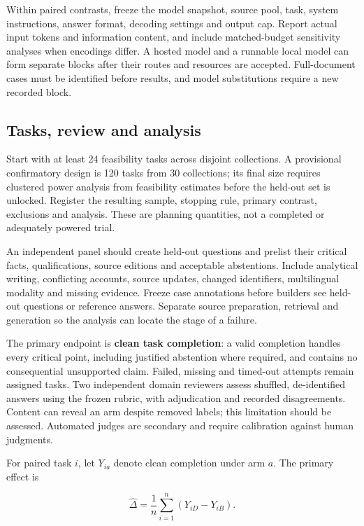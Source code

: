 \documentclass[
  11pt,
]{article}
\begin{document}
Within paired contrasts, freeze the model snapshot, source pool, task,
system instructions, answer format, decoding settings and output cap.
Report actual input tokens and information content, and include
matched-budget sensitivity analyses when encodings differ. A hosted
model and a runnable local model can form separate blocks after their
routes and resources are accepted. Full-document cases must be
identified before results, and model substitutions require a new
recorded block.

\subsection{Tasks, review and analysis}\label{tasks-review-and-analysis}

Start with at least 24 feasibility tasks across disjoint collections. A
provisional confirmatory design is 120 tasks from 30 collections; its
final size requires clustered power analysis from feasibility estimates
before the held-out set is unlocked. Register the resulting sample,
stopping rule, primary contrast, exclusions and analysis. These are
planning quantities, not a completed or adequately powered trial.

An independent panel should create held-out questions and prelist their
critical facts, qualifications, source editions and acceptable
abstentions. Include analytical writing, conflicting accounts, source
updates, changed identifiers, multilingual modality and missing
evidence. Freeze case annotations before builders see held-out questions
or reference answers. Separate source preparation, retrieval and
generation so the analysis can locate the stage of a failure.

The primary endpoint is \textbf{clean task completion}: a valid
completion handles every critical point, including justified abstention
where required, and contains no consequential unsupported claim. Failed,
missing and timed-out attempts remain assigned tasks. Two independent
domain reviewers assess shuffled, de-identified answers using the frozen
rubric, with adjudication and recorded disagreements. Content can reveal
an arm despite removed labels; this limitation should be assessed.
Automated judges are secondary and require calibration against human
judgments.


For paired task \(i\), let \(Y_{ia}\) denote clean completion under arm
\(a\). The primary effect is

\[
\widehat{\Delta}=\frac{1}{n}\sum_{i=1}^{n}(Y_{iD}-Y_{iB}).
\]
\end{document}
